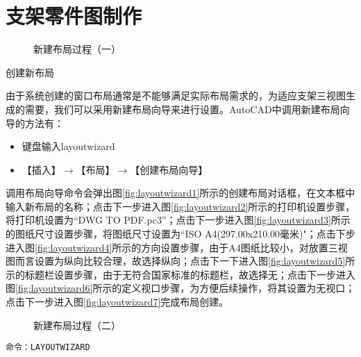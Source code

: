 \section{支架零件图制作}
\begin{procedure}

\begin{figure}[htbp]
\centering
{}\hspace{20pt}
\hspace{20pt}
\caption{新建布局过程（一）}
\end{figure}

\item 创建新布局

由于系统创建的窗口布局通常是不能够满足实际布局需求的，为适应支架三视图生成的需要，我们可以采用新建布局向导来进行设置。AutoCAD中调用新建布局向导的方法有：
\begin{itemize}
\item 键盘输入layoutwizard
\item 【插入】$\rightarrow $【布局】$\rightarrow $【创建布局向导】
\end{itemize}

调用布局向导命令会弹出图\ref{fig:layoutwizard1}所示的创建布局对话框，在文本框中输入新布局的名称；点击下一步进入图\ref{fig:layoutwizard2}所示的打印机设置步骤，将打印机设置为“DWG TO PDF.pc3”；点击下一步进入图\ref{fig:layoutwizard3}所示的图纸尺寸设置步骤，将图纸尺寸设置为“ISO A4(297.00x210.00毫米)"；点击下步进入图\ref{fig:layoutwizard4}所示的方向设置步骤，由于A4图纸比较小，对放置三视图而言设置为纵向比较合理，故选择纵向；点击下一下进入图\ref{fig:layoutwizard5}所示的标题栏设置步骤，由于无符合国家标准的标题栏，故选择无；点击下一步进入图\ref{fig:layoutwizard6}所示的定义视口步骤，为方便后续操作，将其设置为无视口；点击下一步进入图\ref{fig:layoutwizard7}完成布局创建。

\begin{figure}[htbp]
\centering
{}\hspace{20pt}
\hspace{20pt}
\caption{新建布局过程（二）}
\end{figure}
\begin{lstlisting}
命令：LAYOUTWIZARD
\end{lstlisting}


\end{procedure}
